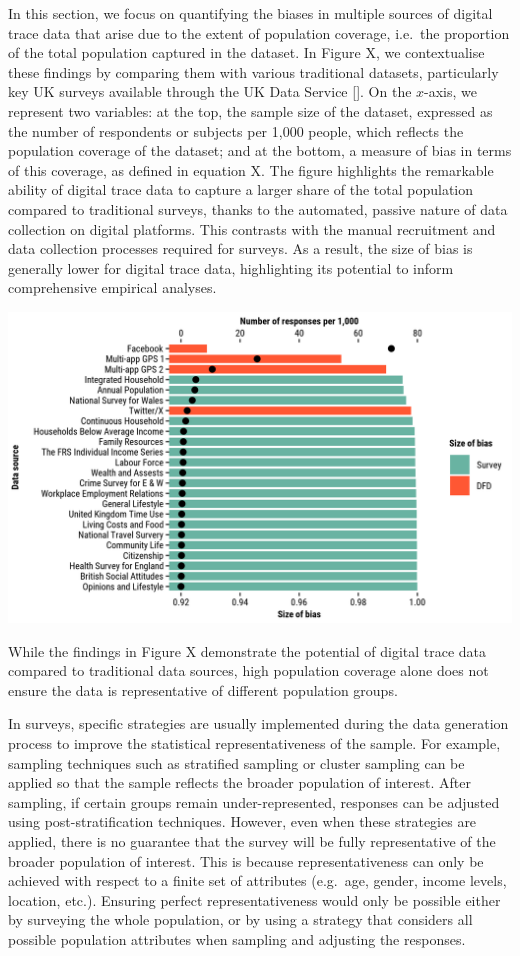 \documentclass[]{rsos}%
\begin{document}
In this section, we focus on quantifying the biases in multiple sources of digital trace data that arise due to the extent of population coverage, i.e.~the proportion of the total population captured in the dataset. In Figure X, we contextualise these findings by comparing them with various traditional datasets, particularly key UK surveys available through the UK Data Service {[}{]}. On the \(x\)-axis, we represent two variables: at the top, the sample size of the dataset, expressed as the number of respondents or subjects per
1,000 people, which reflects the population coverage of the dataset; and
at the bottom, a measure of bias in terms of this coverage, as defined in equation X. The
figure highlights the remarkable ability of digital trace data to
capture a larger share of the total population compared to traditional
surveys, thanks to the automated, passive nature of data collection on
digital platforms. This contrasts with the manual recruitment and data
collection processes required for surveys. As a result, the size of bias is generally lower for digital trace data, highlighting its
potential to inform comprehensive empirical analyses.

\includegraphics{figures/compare-surveys-two-axis.png}

While the findings in Figure X demonstrate the potential of digital trace
data compared to traditional data sources, high population coverage
alone does not ensure the data is representative of different population groups.

In surveys, specific strategies are usually implemented during the data generation process to improve the statistical representativeness of the sample. For example, sampling techniques such as stratified sampling or cluster sampling can be applied so that the sample reflects the broader population of interest. After sampling, if certain groups remain under-represented, responses can be adjusted using post-stratification techniques. However, even when these strategies are applied, there is no guarantee that the survey will be fully representative of the broader population of interest. This is because representativeness can only be achieved with respect to a finite set of attributes (e.g.~age, gender, income levels, location, etc.). Ensuring perfect representativeness would only be possible either by surveying the whole population, or by using a strategy that considers all possible population attributes when sampling and adjusting the responses.
\end{document}
